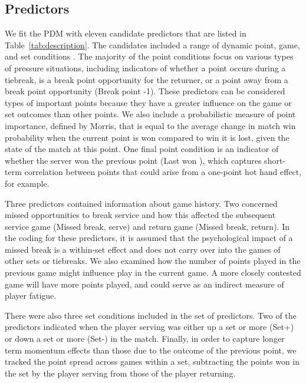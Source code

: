 \documentclass{Latex/svjour3}
\begin{document}
\subsection{Predictors}

We fit the PDM with eleven candidate predictors that are listed in
Table~\ref{tab:description}. The candidates included a range of dynamic point,
game, and set conditions . The majority of the point conditions focus on various types of
pressure situations, including indicators of whether a point occurs during a
tiebreak, is a break point opportunity for the returner, or a point away from a
break point opportunity (Break point -1). These predictors can be considered
types of important points because they have a greater influence on the game or
set outcomes than other points. We also include a probabilistic measure of point
importance, defined by Morris\cite{morris1977most}, that is equal to the average
change in match win probability when the current point is won compared to win it
is lost, given the state of the match at this point. One final point condition
is an indicator of whether the server won the previous point (Last won
), which captures short-term
correlation between points that could arise from a one-point hot hand effect,
for example.

Three predictors contained information about game history. Two concerned missed
opportunities to break service and how this affected the subsequent service game
(Missed break, serve) and return game (Missed break, return). In the coding for
these predictors, it is assumed that the psychological impact of a missed break
is a within-set effect and does not carry over into the games of other sets or
tiebreaks.  We also examined how the number of points played in the previous
game might influence play in the current game. A more closely contested game
will have more points played, and could serve as an indirect measure of player
fatigue.

There were also three set conditions included in the set of predictors. Two of
the predictors indicated when the player serving was either up a set or more
(Set+) or down a set or more (Set-) in the match. Finally, in order to capture
longer term momentum effects than those due to the outcome of the previous
point, we tracked the point spread across games within a set, subtracting the
points won in the set by the player serving from those of the player returning.
\end{document}
